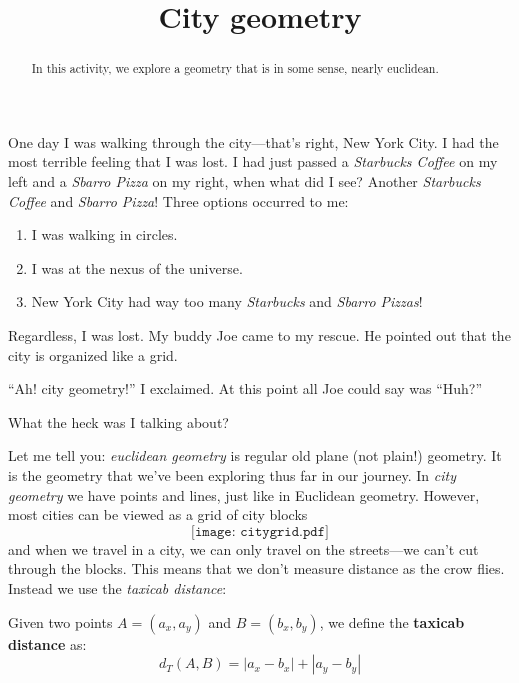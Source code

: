 \documentclass{ximera}
\title{City geometry}
\begin{document}
\begin{abstract}
In this activity, we explore a geometry that is in some sense, nearly
euclidean.
\end{abstract}
\maketitle


One day I was walking through the city---that's right, New York City. I
had the most terrible feeling that I was lost. I had just passed a
\textit{Starbucks Coffee} on my left and a \textit{Sbarro Pizza} on my
right, when what did I see? Another \textit{Starbucks Coffee} and
\textit{Sbarro Pizza}! Three options occurred to me:
\begin{enumerate}
\item I was walking in circles.
\item I was at the nexus of the universe.
\item New York City had way too many \textit{Starbucks} and \textit{Sbarro Pizzas}!
\end{enumerate}
Regardless, I was lost. My buddy Joe came to my rescue. He pointed out that the city is organized like a grid. 

``Ah! city geometry!'' I exclaimed. At this point all Joe could say was
``Huh?''


\begin{question} What the heck was I talking about?
\end{question}

Let me tell you: \textit{euclidean geometry}
is regular old plane (not plain!) geometry. It is the geometry that
we've been exploring thus far in our journey.  In \textit{city
  geometry} we have points and lines, just like in Euclidean geometry.
However, most cities can be viewed as a grid of city blocks
\[
\texttt{[image: citygrid.pdf]}
\]
and when we travel in a city, we can only travel on the streets---we
can't cut through the blocks. This means that we don't measure
distance as the crow flies. Instead we use the \textit{taxicab
  distance}:

\begin{definition}Given two points $A = (a_x,a_y)$ and $B = (b_x,b_y)$, we define the
\textbf{taxicab distance} as:
\[
d_T(A,B) = |a_x - b_x| + |a_y - b_y|
\]
\end{definition}
\end{document}

